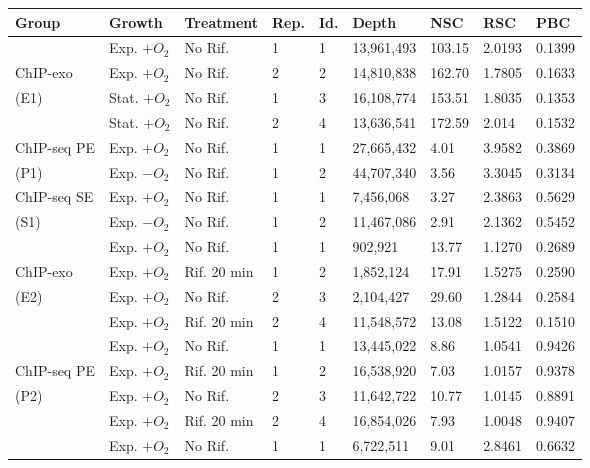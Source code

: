 \documentclass{bmcart}
\begin{document}
\begin{table}[h!]
  \centering
  \begin{tabu} to\linewidth{X[1.4,m,c]|X[1.2]|X[1.3,m,c]|X[.4,m,c]|X[.6,m,c]|X[1.2]|X[.6]|X[.6]|X[.5]}
    \firsthline
    \textbf{Group} & \textbf{Growth} & \textbf{Treatment} & \textbf{Rep.} & \textbf{Id.} &
    \textbf{Depth} & \textbf{NSC} & \textbf{RSC} & 
    \textbf{PBC}  \\
    \hline 
    &  Exp. $+O_2$ & No Rif. & 1 & 1 & 13,961,493 & 103.15 & 2.0193 & 0.1399 \\
    ChIP-exo  & Exp. $+O_2$ & No Rif. & 2 & 2 &14,810,838 & 162.70 &
    1.7805 & 0.1633 \\
    (E1)   & Stat. $+O_2$ & No Rif. & 1 & 3& 16,108,774 & 153.51 &
    1.8035 & 0.1353 \\
    & Stat. $+O_2$ & No Rif. & 2 & 4 & 13,636,541 & 172.59 & 2.014 & 0.1532 \\ 
    \hline
    ChIP-seq PE & Exp. $+O_2$ & No Rif. & 1 & 1 & 27,665,432 & 4.01 & 
    3.9582 & 0.3869 \\
    (P1) & Exp. $-O_2$ & No Rif. & 1 & 2 & 44,707,340 & 3.56 & 
    3.3045 & 0.3134 \\
    \hline
    ChIP-seq SE & Exp. $+O_2$ & No Rif. & 1 & 1 & 7,456,068 & 3.27 & 
    2.3863 & 0.5629 \\
    (S1) & Exp. $-O_2$ & No Rif. & 1 & 2 & 11,467,086 & 2.91 & 
    2.1362 & 0.5452 \\
    \hline\hline
    &  Exp. $+O_2$  & No Rif. & 1 & 1 &902,921 & 13.77 & 1.1270 & 0.2689\\
    ChIP-exo   & Exp. $+O_2$ & Rif. 20 min & 1 & 2 & 1,852,124 & 17.91 &
    1.5275 & 0.2590\\
    (E2)  & Exp. $+O_2$ & No Rif. &  2 & 3 & 2,104,427 & 29.60 & 1.2844 & 
    0.2584\\
    & Exp. $+O_2$ & Rif. 20 min & 2 & 4 & 11,548,572 & 13.08 & 1.5122 & 0.1510 \\
    \hline
    & Exp. $+O_2$ & No Rif. & 1 & 1 & 13,445,022 & 8.86 & 1.0541 & 0.9426 \\
    ChIP-seq PE & Exp. $+O_2$ & Rif. 20 min & 1 & 2 & 16,538,920 & 7.03 & 
    1.0157 & 0.9378 \\
    (P2) & Exp. $+O_2$ & No Rif. & 2  & 3 & 11,642,722 & 10.77 & 1.0145 &
    0.8891 \\
    & Exp. $+O_2$ & Rif. 20 min & 2 & 4 & 16,854,026 & 7.93 &1.0048& 0.9407 \\
    \hline
    & Exp. $+O_2$ & No Rif. & 1 & 1 & 6,722,511 & 9.01 & 2.8461 & 0.6632 \\

\end{tabu}
\end{table}
\end{document}

